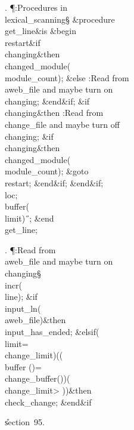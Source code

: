 . \P\?:Procedures in \\{lexical\_scanning}\X\mathrel{+}\S\?\6
\&{procedure}\8\1\\{get\_line}\2\8\&{is}\8\1\6
\4\&{begin}\6
\4\BL\\{restart}\EL\8\&{if}\1\1\8\\{changing}\2\8\&{then}\6
\\{changed\_module}\?\1(\?\\{module\_count}\?\2)\K\?;\6
\4\&{else}\6
:Read from \\{aweb\_file} and maybe turn on \\{changing}\X;\2\6
\&{end}\8\2\&{if}\1;\6
\&{if}\1\1\8\\{changing}\2\8\&{then}\6
:Read from \\{change\_file} and maybe turn off \\{changing}\X;\6
\&{if}\1\1\?\8\R\?\\{changing}\2\8\&{then}\6
\\{changed\_module}\?\1(\?\\{module\_count}\?\2)\K\?;\5
\&{goto}\8\\{restart};\2\6
\&{end}\8\2\&{if}\1;\2\6
\&{end}\8\2\&{if}\1;\6
\\{loc}\?\K{};\5
\\{buffer}\?\1(\?\\{limit}\?\2)\K\?\H{\ };\2\6
\&{end}\8\\{get\_line};\par
\fi

. \P\?:Read from \\{aweb\_file} and maybe turn on \\{changing}\X\S\?\6
\\{incr}\?\1(\?\\{line}\?\2)\?;\6
\&{if}\1\1\?\8\R\?\\{input\_ln}\?\1(\?\\{aweb\_file}\?\2)\?\2\8\&{then}\6
\\{input\_has\_ended}\?\K\?;\6
\4\&{elsif}\1\?\8\1(\?\\{limit}\?=\?\\{change\_limit}\?\2)\W\1(\1(\?\\{buffer}%
\?\1(\?\2)=\?\\{change\_buffer}\?\1(\?\2)\2)\W\1(\?\\{change\_limit}\?>%
\?\2)\2)\?\2\8\&{then}\6
\\{check\_change};\2\6
\&{end}\8\2\&{if}\1\par
\U section~95.\fi

